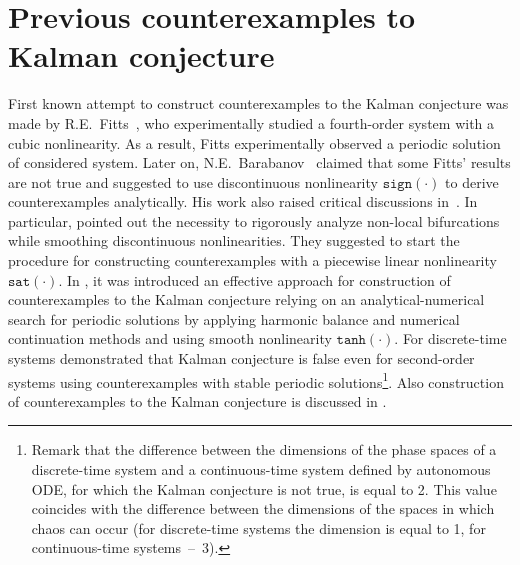 \documentclass{ifacconf}
\theoremstyle{plain}
\begin{document}
\section{Previous counterexamples to Kalman conjecture}
First known attempt to construct counterexamples to the Kalman conjecture
was made by R.E.~Fitts~\citep{Fitts-1966},
who experimentally studied a fourth-order system
with a cubic nonlinearity.
As a result, Fitts experimentally observed a periodic solution of considered system.
Later on, N.E.~Barabanov~\citep{Barabanov-1988} claimed that some Fitts' results
are not true and suggested to use discontinuous nonlinearity $\texttt{sign}(\cdot)$
to derive counterexamples analytically.
His work also raised critical discussions
in~\citep{BernatL-1996,Meisters-1996,UMN-1998}.
In particular, \cite{BernatL-1996} pointed out the necessity to rigorously analyze
non-local bifurcations while smoothing discontinuous nonlinearities.
They suggested
to start the procedure for constructing counterexamples
with a piecewise linear nonlinearity $\texttt{sat}(\cdot)$.
In \citep{BraginKL-2010-IFAC,BraginVKL-2011,LeonovK-2011-DAN},
it was introduced an effective approach for
construction of counterexamples to the Kalman conjecture relying on
an analytical-numerical search for periodic solutions by applying harmonic balance and
numerical continuation methods and using smooth nonlinearity $\texttt{tanh}(\cdot)$.
For discrete-time systems \cite{HeathCS-2015} demonstrated that Kalman conjecture
is false even for second-order systems using counterexamples
with stable periodic solutions\footnote{
    Remark that the difference between the dimensions of the phase spaces of a discrete-time system
    and a continuous-time system defined by autonomous ODE,
    for which the Kalman conjecture is not true, is equal to 2.
    This value coincides with the difference between the dimensions of the spaces
    in which chaos can occur (for discrete-time systems the dimension is equal to 1,
    for continuous-time systems~--~3).
}.
Also construction of counterexamples to the Kalman conjecture
is discussed in \citep{BurkinK-2014-HA}.
\end{document}
